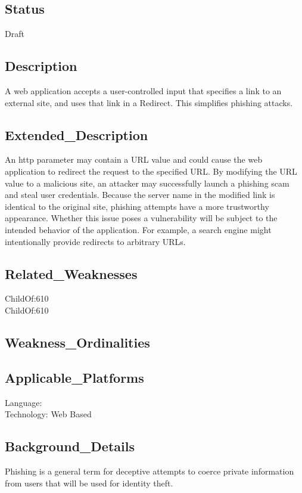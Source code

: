 \subsection*{Status}
Draft

\subsection*{Description}
A web application accepts a user-controlled input that specifies a link to an external site, and uses that link in a Redirect. This simplifies phishing attacks.

\subsection*{Extended\_Description}
An http parameter may contain a URL value and could cause the web application to redirect the request to the specified URL. By modifying the URL value to a malicious site, an attacker may successfully launch a phishing scam and steal user credentials. Because the server name in the modified link is identical to the original site, phishing attempts have a more trustworthy appearance. Whether this issue poses a vulnerability will be subject to the intended behavior of the application. For example, a search engine might intentionally provide redirects to arbitrary URLs.

\subsection*{Related\_Weaknesses}
ChildOf:610\\
ChildOf:610\\
\subsection*{Weakness\_Ordinalities}
\subsection*{Applicable\_Platforms}
Language: \\
Technology: Web Based\\
\subsection*{Background\_Details}
Phishing is a general term for deceptive attempts to coerce private information from users that will be used for identity theft.\\
